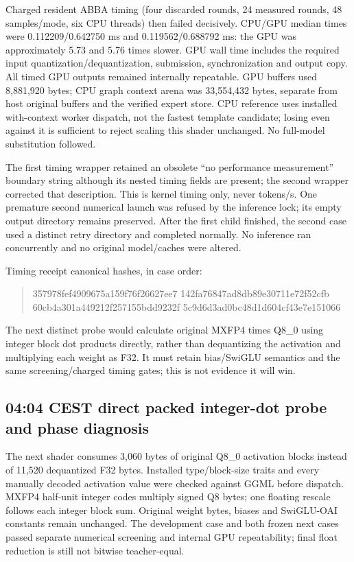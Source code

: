 Charged resident ABBA timing (four discarded rounds, 24 measured rounds,
48 samples/mode, six CPU threads) then failed decisively. CPU/GPU median
times were 0.112209/0.642750 ms and 0.119562/0.688792 ms:
the GPU was approximately 5.73 and 5.76 times slower. GPU wall time includes
the required input quantization/dequantization, submission, synchronization
and output copy. All timed GPU outputs remained internally repeatable.
GPU buffers used 8,881,920 bytes; CPU graph context arena was 33,554,432
bytes, separate from host original buffers and the verified expert store.
CPU reference uses installed with-context worker dispatch, not the fastest
template candidate; losing even against it is sufficient to reject scaling
this shader unchanged. No full-model substitution followed.

The first timing wrapper retained an obsolete ``no performance measurement''
boundary string although its nested timing fields are present; the second
wrapper corrected that description. This is kernel timing only, never tokens/s.
One premature second numerical launch was refused by the inference lock;
its empty output directory remains preserved. After the first child finished,
the second case used a distinct retry directory and completed normally.
No inference ran concurrently and no original model/caches were altered.

Timing receipt canonical hashes, in case order:
\begin{quote}\ttfamily\small
357978fef4909675a159f76f26627ee7\allowbreak
142fa76847ad8db89e30711e72f52cfb\\
60cb4a301a449212f257155bdd9232f\allowbreak
5c9d6d3ad0bc48d1d604cf43e7e151066
\end{quote}
The next distinct probe would calculate original MXFP4 times Q8\_0 using
integer block dot products directly, rather than dequantizing the activation
and multiplying each weight as F32. It must retain bias/SwiGLU semantics and
the same screening/charged timing gates; this is not evidence it will win.

\subsection{04:04 CEST direct packed integer-dot probe and phase diagnosis}
The next shader consumes 3,060 bytes of original Q8\_0 activation blocks
instead of 11,520 dequantized F32 bytes. Installed type/block-size traits
and every manually decoded activation value were checked against GGML
before dispatch. MXFP4 half-unit integer codes multiply signed Q8 bytes;
one floating rescale follows each integer block sum. Original weight bytes,
biases and SwiGLU-OAI constants remain unchanged. The development case and
both frozen next cases passed separate numerical screening and internal GPU
repeatability; final float reduction is still not bitwise teacher-equal.


